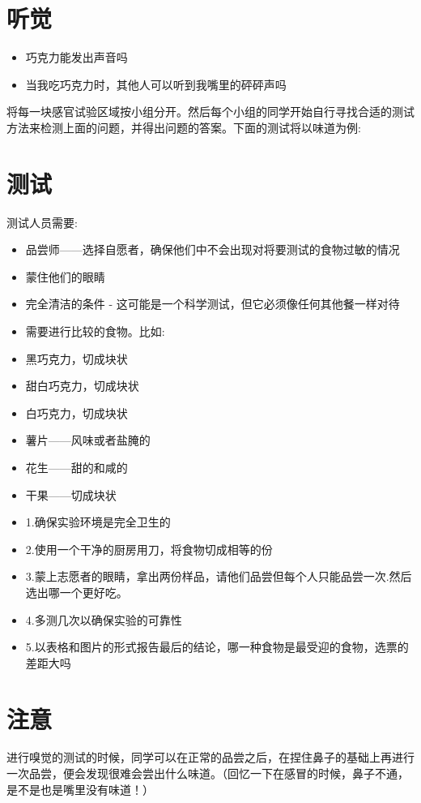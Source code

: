 \begin{note}
\section{听觉}
       \begin{itemize}
         \item 巧克力能发出声音吗
         \item 当我吃巧克力时，其他人可以听到我嘴里的砰砰声吗
       \end{itemize}  

       \par
       将每一块感官试验区域按小组分开。然后每个小组的同学开始自行寻找合适的测试方法来检测上面的问题，并得出问题的答案。下面的测试将以味道为例:\par

\section{测试}
      测试人员需要:\par
      \begin{itemize}
        \item 品尝师——选择自愿者，确保他们中不会出现对将要测试的食物过敏的情况
        \item 蒙住他们的眼睛
        \item 完全清洁的条件 - 这可能是一个科学测试，但它必须像任何其他餐一样对待
        \item 需要进行比较的食物。比如:
        \item 黑巧克力，切成块状
        \item 甜白巧克力，切成块状 
        \item 白巧克力，切成块状
        \item 薯片——风味或者盐腌的
        \item 花生——甜的和咸的
        \item 干果——切成块状
        \item 1.确保实验环境是完全卫生的
        \item 2.使用一个干净的厨房用刀，将食物切成相等的份
        \item 3.蒙上志愿者的眼睛，拿出两份样品，请他们品尝但每个人只能品尝一次.然后选出哪一个更好吃。
        \item 4.多测几次以确保实验的可靠性
        \item 5.以表格和图片的形式报告最后的结论，哪一种食物是最受迎的食物，选票的差距大吗
      \end{itemize} 
      

      
\section{注意}
      进行嗅觉的测试的时候，同学可以在正常的品尝之后，在捏住鼻子的基础上再进行一次品尝，便会发现很难会尝出什么味道。（回忆一下在感冒的时候，鼻子不通，是不是也是嘴里没有味道！）


\end{note}
   
